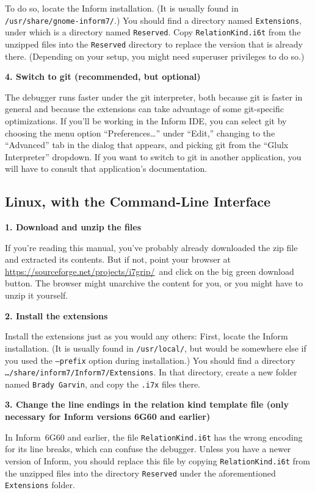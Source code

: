 \documentclass{book}
\newcommand{\lastpagebreak}{\vfill\pagebreak}
\newcommand{\downloadurl}{\url{https://sourceforge.net/projects/i7grip/}}
\newcommand{\downloadclick}{click on the big green download button}
\begin{document}
To do so, locate the Inform installation.  (It is usually found in
\texttt{/usr/share/gnome-inform7/}.)  You should find a directory named
\texttt{Extensions}, under which is a directory named \texttt{Reserved}.  Copy
\texttt{RelationKind.i6t} from the unzipped files into the \texttt{Reserved}
directory to replace the version that is already there.  (Depending on your
setup, you might need superuser privileges to do so.)

\textbf{4. Switch to git (recommended, but optional)}

The debugger runs faster under the git interpreter, both because git is faster
in general and because the extensions can take advantage of some git-specific
optimizations.  If you'll be working in the Inform IDE, you can select git by
choosing the menu option ``Preferences\dots'' under ``Edit,'' changing to the
``Advanced'' tab in the dialog that appears, and picking git from the ``Glulx
Interpreter'' dropdown.  If you want to switch to git in another application,
you will have to consult that application's documentation.

\lastpagebreak

\subsection{Linux, with the Command-Line Interface}

\textbf{1. Download and unzip the files}

If you're reading this manual, you've probably already downloaded the zip file
and extracted its contents.  But if not, point your browser at \downloadurl\ and
\downloadclick.  The browser might unarchive the content for you, or you might
have to unzip it yourself.

\textbf{2. Install the extensions}

Install the extensions just as you would any others: First, locate the Inform
installation.  (It is usually found in \texttt{/usr/local/}, but would be
somewhere else if you used the \texttt{--prefix} option during installation.)
You should find a directory \texttt{\dots/share/inform7/Inform7/Extensions}.  In
that directory, create a new folder named \texttt{Brady Garvin},
and copy the \texttt{.i7x} files there.

\textbf{3. Change the line endings in the relation kind template file (only
  necessary for Inform versions 6G60 and earlier)}

In Inform~6G60 and earlier, the file \texttt{RelationKind.i6t} has the wrong
encoding for its line breaks, which can confuse the debugger.  Unless you have a
newer version of Inform, you should replace this file by copying
\texttt{RelationKind.i6t} from the unzipped files into the directory
\texttt{Reserved} under the aforementioned \texttt{Extensions} folder.
\end{document}
